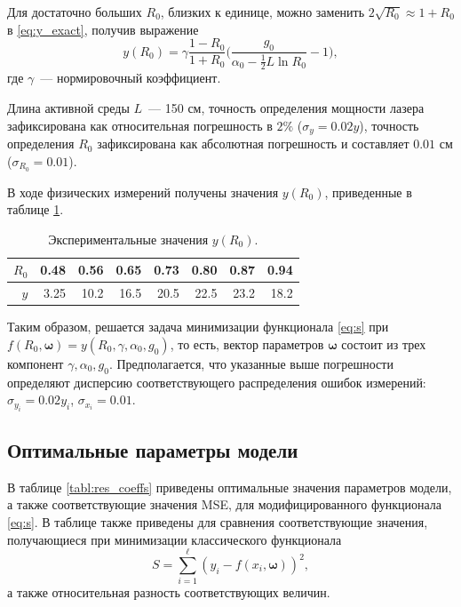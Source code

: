 \documentclass[11pt,a4paper]{article}
\begin{document}
Для достаточно больших $R_0$, близких к единице, можно заменить
$2 \sqrt{R_0} \approx 1 + R_0$ в \eqref{eq:y_exact}, получив выражение
\begin{equation}
  y(R_0) = \gamma \frac{1 - R_0}{1 + R_0} \Big(\frac{g_0}{\alpha_0 - \frac{1}{2} L \ln R_0} - 1\Big),
\end{equation}
где $\gamma$~--- нормировочный коэффициент.

Длина активной среды $L$~--- 150 см, точность определения мощности лазера зафиксирована
как относительная погрешность в $2\%$ ($\sigma_y = 0.02y$), точность определения $R_0$
зафиксирована как абсолютная погрешность и составляет $0.01$ см ($\sigma_{R_0} = 0.01$).

В ходе физических измерений получены значения $y(R_0)$, приведенные в таблице \ref{tabl:measurements}.

\begin{table}[h]
  \caption{Экспериментальные значения $y(R_0)$.}
  \centering
  \begin{tabular}{| r | r | r | r | r | r | r | r |}
	\hline
	$R_0$	&	0.48	&	0.56	&	0.65	&	0.73	&	0.80	&	0.87	&	0.94	\\ \hline
	$y$		&	3.25	&	10.2	&	16.5	&	20.5	&	22.5	&	23.2	&	18.2	\\ \hline
  \end{tabular}
  \label{tabl:measurements}
\end{table}

Таким образом, решается задача минимизации функционала \eqref{eq:s} при
$f(R_0, \boldsymbol{\omega}) = y(R_0, \gamma, \alpha_0, g_0)$,
то есть, вектор параметров $\boldsymbol{\omega}$ состоит из трех компонент
$\gamma, \alpha_0, g_0$. Предполагается, что указанные выше погрешности определяют
дисперсию соответствующего распределения ошибок измерений: $\sigma_{y_i} = 0.02 y_i$, $\sigma_{x_i} = 0.01$.

\subsection{Оптимальные параметры модели}
В таблице \ref{tabl:res_coeffs} приведены оптимальные значения параметров модели, а также
соответствующие значения MSE, для модифицированного функционала \eqref{eq:s}. В таблице
также приведены для сравнения соответствующие значения, получающиеся при минимизации
классического функционала
\begin{equation}
  S = \sum_{i = 1}^\ell (y_i - f(x_i, \boldsymbol{\omega}))^2,
  \label{eq:s_classic}
\end{equation}
а также относительная разность соответствующих величин.
\end{document}
